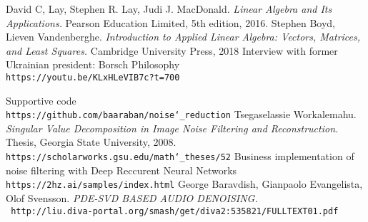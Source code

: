\begin{thebibliography}{9} 
	David C, Lay, Stephen R. Lay, Judi J. MacDonald. \textit{Linear Algebra and Its Applications.} Pearson Education Limited, 5th edition, 2016.
	Stephen Boyd, Lieven Vandenberghe. \textit{Introduction to Applied Linear Algebra: Vectors, Matrices, and Least Squares.} Cambridge University Press, 2018
	Interview with former Ukrainian president: Borsch Philosophy
	\\\texttt{https://youtu.be/KLxHLeVIB7c?t=700}
	
	Supportive code
	\\\texttt{https://github.com/baaraban/noise\char`_reduction}
	Tsegaselassie Workalemahu. \textit{Singular Value Decomposition in Image Noise Filtering and Reconstruction.} Thesis, Georgia State University, 2008.
	\\\texttt{https://scholarworks.gsu.edu/math\char`_theses/52}
	Business implementation of noise filtering with Deep Reccurent Neural Networks
	\\\texttt{https://2hz.ai/samples/index.html}
	George Baravdish, Gianpaolo Evangelista, Olof Svensson. \textit{PDE-SVD BASED AUDIO DENOISING.}
	\\\texttt{	http://liu.diva-portal.org/smash/get/diva2:535821/FULLTEXT01.pdf}
\end{thebibliography}


